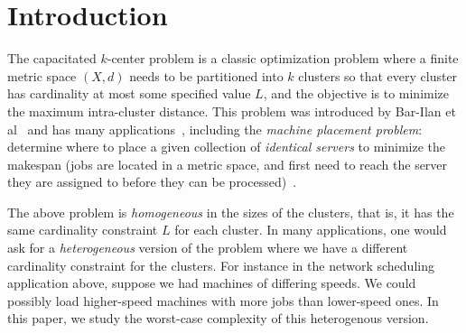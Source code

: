\section{Introduction}
The capacitated $k$-center problem is a classic optimization problem where a finite metric space $(X,d)$ needs to be partitioned into $k$ clusters so that  every  cluster has cardinality at most
some specified value $L$, and the objective is to minimize the maximum intra-cluster distance. This problem was introduced by Bar-Ilan et al~\cite{Bar-IlanKP93} and has many applications~\cite{LuptonMY98,MorganL77,Murthy1983AnAA}, including %
the {\em machine placement problem}: determine where to place a given collection of \emph{identical servers} to minimize the makespan (jobs are located in a metric space, and first need to reach the server they are assigned to before they can be processed)~\cite{PSW97}. %

The above problem is {\em homogeneous} in the sizes of the clusters, that is, it has the same cardinality constraint $L$ for each cluster. In many applications, one would ask for a \emph{heterogeneous} version of the problem where we have a different cardinality constraint for the clusters.
For instance in the network scheduling application above, suppose we had machines of differing speeds. We could possibly load higher-speed machines with more jobs than lower-speed ones. In this paper, we study  the worst-case complexity of this heterogenous version.

